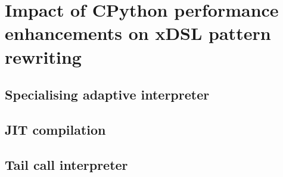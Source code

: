 \chapter{Impact of CPython performance enhancements on xDSL pattern rewriting}
\label{chap:impact-cpython-pattern-rewriting}

\section{Specialising adaptive interpreter}
\section{JIT compilation}
\section{Tail call interpreter}


